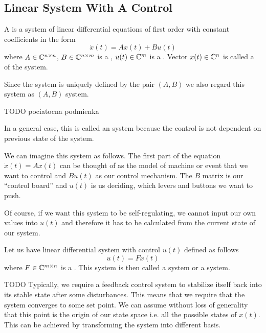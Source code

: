\subsection{Linear System With A Control}

\begin{definition}
	A  is a system of linear differential equations of first order with constant coefficients in the form $$\dot{x}(t)=Ax(t)+Bu(t)$$ where $A\in\mathbb{C}^{n\times n}$, $B\in\mathbb{C}^{n\times m}$ is a , $u(t)\in\mathbb{C}^m$ is a . Vector $x(t)\in\mathbb{C}^n$ is called a  of the system.

	Since the system is uniquely defined by the pair $(A,B)$ we also regard this system as $(A,B)$ system.

	TODO pociatocna podmienka
\end{definition}

In a general case, this is called an  system because the control is not dependent on previous state of the system.

We can imagine this system as follows. The first part of the equation $\dot{x}(t)=Ax(t)$ can be thought of as the model of machine or event that we want to control and $Bu(t)$ as our control mechanism. The $B$ matrix is our ``control board'' and $u(t)$ is us deciding, which levers and buttons we want to push. 

Of course, if we want this system to be self-regulating, we cannot input our own values into $u(t)$ and therefore it has to be calculated from the current state of our system.

\begin{definition}
	Let us have linear differential system with control $u(t)$ defined as follows $$u(t)=Fx(t)$$ where $F\in\mathbb{C}^{m\times n}$ is a . This system is then called a  system or a  system.
\end{definition}

TODO Typically, we require a feedback control system to stabilize itself back into its stable state after some disturbances. This means that we require that the system converges to some set point. We can assume without loss of generality that this point is the origin of our state space i.e. all the possible states of $x(t)$. This can be achieved by transforming the system into different basis.

